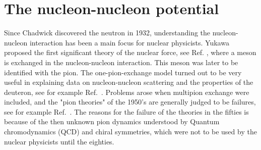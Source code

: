 \chapter{The nucleon-nucleon potential}

Since Chadwick discovered the neutron in 1932, understanding the 
nucleon-nucleon interaction has been a main focus for nuclear physicists.
Yukawa  proposed the first significant theory of the nuclear 
force, see Ref. \cite{yukawa35}, where a meson is exchanged in the 
nucleon-nucleon interaction. This 
meson was later to be identified with the pion. The one-pion-exchange model
turned out to be very useful in explaining data on nucleon-nucleon scattering
and the properties of the deuteron, see for example Ref.~\cite{machleidt2007}. 
Problems arose when multipion exchange were included, and the "pion 
theories" of the 1950's are generally judged to be failures, see for example 
Ref.~\cite{machleidt2007}. 
The reasons for the failure of the theories in the fifties is because of the
then unknown pion dynamics understood by Quantum chromodynamics (QCD) and chiral symmetries, which were not to be used by the nuclear physicists until the eighties. 


